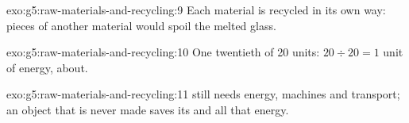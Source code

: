\begin{solution}{exo:g5:raw-materials-and-recycling:9}
Each material is recycled in its own way: pieces of another material
would spoil the melted glass.
\end{solution}

\begin{solution}{exo:g5:raw-materials-and-recycling:10}
One twentieth of 20 units: $20 \div 20 = 1$ unit of energy, about.
\end{solution}

\begin{solution}{exo:g5:raw-materials-and-recycling:11}
 still needs energy, machines and transport; an object that is
never made saves its  and all that energy.
\end{solution}
